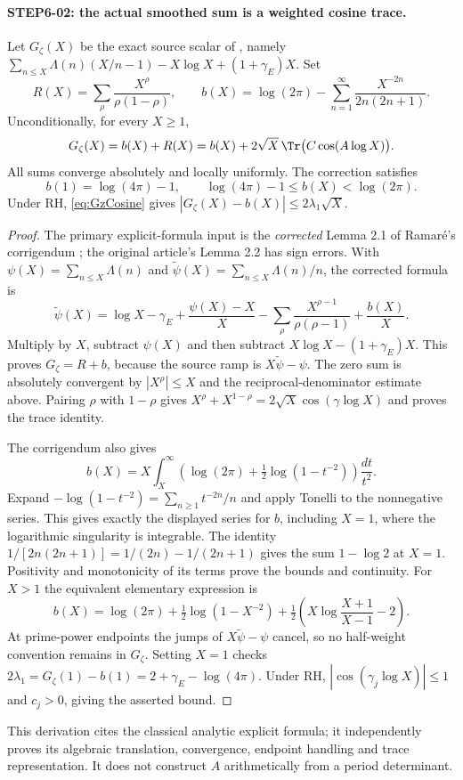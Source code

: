 \paragraph{STEP6-02: the actual smoothed sum is a weighted cosine trace.}
Let $G_\zeta(X)$ be the exact source scalar of , namely
$\sum_{n\le X}\Lambda(n)(X/n-1)-X\log X+(1+\gamma_E)X$. Set
\[
 R(X)=\sum_\rho\frac{X^\rho}{\rho(1-\rho)},\qquad
 b(X)=\log(2\pi)-\sum_{n=1}^\infty\frac{X^{-2n}}{2n(2n+1)}.
\]
Unconditionally, for every $X\ge1$,
\begin{equation}\label{eq:GzCosine}
 G_\zeta(X)=b(X)+R(X)
 =b(X)+2\sqrt X\,\Tr\bigl(C\cos(A\log X)\bigr).
\end{equation}
All sums converge absolutely and locally uniformly. The correction satisfies
\[
 b(1)=\log(4\pi)-1,\qquad
 \log(4\pi)-1\le b(X)<\log(2\pi).
\]
Under RH, \eqref{eq:GzCosine} gives
$|G_\zeta(X)-b(X)|\le2\lambda_1\sqrt X$.
\begin{proof}
The primary explicit-formula input is the \emph{corrected} Lemma 2.1 of Ramar\'e's corrigendum \cite[pp.~1--2]{ramare}; the original article's Lemma 2.2 has sign errors. With $\psi(X)=\sum_{n\le X}\Lambda(n)$ and $\widetilde\psi(X)=\sum_{n\le X}\Lambda(n)/n$, the corrected formula is
\[
 \widetilde\psi(X)=\log X-\gamma_E+\frac{\psi(X)-X}{X}
 -\sum_\rho\frac{X^{\rho-1}}{\rho(\rho-1)}+\frac{b(X)}X.
\]
Multiply by $X$, subtract $\psi(X)$ and then subtract
$X\log X-(1+\gamma_E)X$. This proves $G_\zeta=R+b$, because the source ramp is $X\widetilde\psi-\psi$. The zero sum is absolutely convergent by $|X^\rho|\le X$ and the reciprocal-denominator estimate above. Pairing $\rho$ with $1-\rho$ gives
$X^\rho+X^{1-\rho}=2\sqrt X\cos(\gamma\log X)$ and proves the trace identity.

The corrigendum also gives
\[
 b(X)=X\int_X^\infty
 \left(\log(2\pi)+\tfrac12\log(1-t^{-2})\right)\frac{dt}{t^2}.
\]
Expand $-\log(1-t^{-2})=\sum_{n\ge1}t^{-2n}/n$ and apply Tonelli to the nonnegative series. This gives exactly the displayed series for $b$, including $X=1$, where the logarithmic singularity is integrable. The identity
$1/[2n(2n+1)]=1/(2n)-1/(2n+1)$ gives the sum $1-\log2$ at $X=1$. Positivity and monotonicity of its terms prove the bounds and continuity. For $X>1$ the equivalent elementary expression is
\[
 b(X)=\log(2\pi)+\tfrac12\log(1-X^{-2})
 +\tfrac12\left(X\log\frac{X+1}{X-1}-2\right).
\]
At prime-power endpoints the jumps of $X\widetilde\psi-\psi$ cancel, so no half-weight convention remains in $G_\zeta$. Setting $X=1$ checks
$2\lambda_1=G_\zeta(1)-b(1)=2+\gamma_E-\log(4\pi)$.
Under RH, $|\cos(\gamma_j\log X)|\le1$ and $c_j>0$, giving the asserted bound.
\end{proof}
This derivation cites the classical analytic explicit formula; it independently proves its algebraic translation, convergence, endpoint handling and trace representation. It does not construct $A$ arithmetically from a period determinant.

